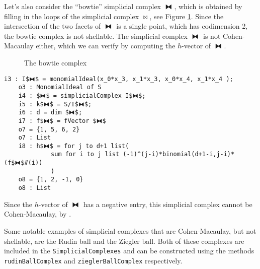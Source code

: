 \documentclass[12pt,leqno]{amsart}
\theoremstyle{definition}
\newenvironment{example}
{\pushQED{\qed}\renewcommand{\qedsymbol}{$\diamond$}\examplex}
{\popQED\endexamplex}
\begin{document}
\begin{example}
  Let's also consider the ``bowtie'' simplicial complex $\fbowtie$, which is obtained by filling in the loops of the simplicial complex $\bowtie$, see Figure \ref{Figure: the bowtie complex}. Since the intersection of the two facets of $\fbowtie$ is a single point, which has codimension 2, the bowtie complex is not shellable. The simplicial complex $\fbowtie$ is not Cohen-Macaulay either, which we can verify by computing the $h$-vector of $\fbowtie$.
  \begin{figure}[h]
    \caption{The bowtie complex}\label{Figure: the bowtie complex}
  \end{figure}
\begin{lstlisting}[basicstyle={\ttfamily \scriptsize}, xleftmargin=-23pt]
    i3 : I$⧓$ = monomialIdeal(x_0*x_3, x_1*x_3, x_0*x_4, x_1*x_4 );
    o3 : MonomialIdeal of S
    i4 : $⧓$ = simplicialComplex I$⧓$;
    i5 : k$⧓$ = S/I$⧓$;
    i6 : d = dim $⧓$;
    i7 : f$⧓$ = fVector $⧓$
    o7 = {1, 5, 6, 2}
    o7 : List
    i8 : h$⧓$ = for j to d+1 list(
             sum for i to j list (-1)^(j-i)*binomial(d+1-i,j-i)*(f$⧓$#(i))
             )
    o8 = {1, 2, -1, 0}
    o8 : List
\end{lstlisting}
  Since the $h$-vector of $\fbowtie$ has a negative entry, this simplicial complex cannot be Cohen-Macaulay, by \cite[Lemma 5.1.10]{BH}.

  Some notable examples of simplicial complexes that are Cohen-Macaulay, but not shellable, are the Rudin ball and the Ziegler ball. Both of these complexes are included in the \texttt{SimplicialComplexes} and can be constructed using the methods \texttt{rudinBallComplex} and \texttt{zieglerBallComplex} respectively.
\end{example}
%
\end{document}
